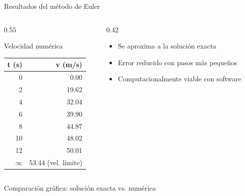 \documentclass[main.tex]{subfiles}
\begin{document}
\begin{frame}[c]{Resultados del método de Euler}
\begin{columns}[T,onlytextwidth]
  \begin{column}{0.55\textwidth}
    \begin{block}{Velocidad numérica}
    \begin{tabular}{@{}rr@{}}
    \toprule
    \textbf{t (s)} & \textbf{v (m/s)} \\
    \midrule
    0  & 0.00 \\
    2  & 19.62 \\
    4  & 32.04 \\
    6  & 39.90 \\
    8  & 44.87 \\
    10 & 48.02 \\
    12 & 50.01 \\
    $\infty$ & 53.44 (vel. límite) \\
    \bottomrule
    \end{tabular}
    \end{block}
  \end{column}
  \begin{column}{0.42\textwidth}
    \begin{itemize}
      \item Se aproxima a la solución exacta
      \item Error reducido con pasos más pequeños
      \item Computacionalmente viable con software
    \end{itemize}
  \end{column}
\end{columns}
\end{frame}

\begin{frame}[c]{Comparación gráfica: solución exacta vs. numérica}
\centering
\footnotesize
{}
\end{frame}
\end{document}
